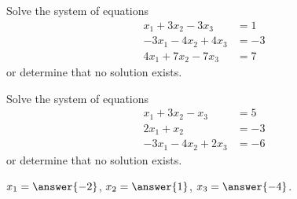 \documentclass{ximera}
\begin{document}
\begin{exercise}%
    Solve the system of equations
    \begin{equation*}
        \begin{split}
            x_1 + 3x_2 - 3x_3 &= 1 \\ 
             -3x_1 - 4x_2  +4x_3 &= -3\\
            4x_1 + 7x_2 - 7x_3 &= 7 
        \end{split}
    \end{equation*}
    or determine that no solution exists.
    \begin{multipleChoice}
    \end{multipleChoice}
\end{exercise}

\begin{exercise}%
    Solve the system of equations
    \begin{equation*}
        \begin{split}
             x_1  + 3x_2  - x_3 &= 5 \\ 
             2x_1 +x_2 &= -3\\
            -3x_1 - 4x_2 + 2x_3 &= -6 
        \end{split}
    \end{equation*}
    or determine that no solution exists.
    \begin{multipleChoice}
    \end{multipleChoice}
    \begin{problem}
        $x_1 = \answer{-2}$, $x_2 = \answer{1}$, $x_3 = \answer{-4}$.
    \end{problem}
\end{exercise}
\end{document}
